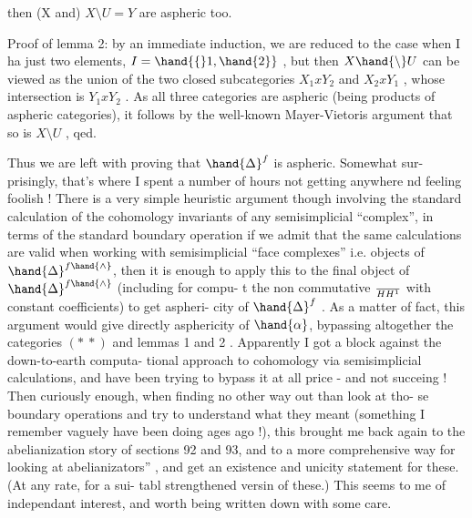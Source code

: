 
then (X and) $X\setminus U = Y$ are aspheric too.

Proof of lemma 2: by an immediate induction, we are reduced to
the case when I ha just two elements, $I = \hand{\{}1,\hand{2\}}$ , but then $X\hand{\setminus} U$
can be viewed as the union of the two closed subcategories $X_1 x Y_2$ and
$X_2 x Y_1$ , whose intersection is $Y_1 x Y_2$ . As all three categories are
aspheric (being products of aspheric categories), it follows by the
well-known Mayer-Vietoris argument that so is $X\setminus U$ , qed.

Thus we are left with proving that $\hand{\Delta}^{f}$ is aspheric. Somewhat sur-%
prisingly, that's where I spent a number of hours not getting anywhere
nd feeling foolish ! There is a very simple heuristic argument though
involving the standard calculation of the cohomology invariants of any
semisimplicial ``complex'', in terms of the standard boundary operation
 if we admit that the same calculations are valid when working with
semisimplicial ``face complexes'' i.e. objects of  $\hand{\Delta}^{f\hand{\wedge}}$, then it is
enough to apply this to the final object of $\hand{\Delta}^{f\hand{\wedge}}$ (including for compu-%
t  the non commutative $\over{H}{H}^1$ with constant coefficients) to get aspheri-%
city of $\hand{\Delta}^{f}$ . As a matter of fact, this argument would give directly
asphericity of $\hand{\alpha}$, bypassing altogether the categories $(*\ *)$ and lemmas
1 and 2 . Apparently I got a block against the down-to-earth computa-%
tional approach to cohomology via semisimplicial calculations, and
have been trying to bypass it at all price - and not succeing !
Then curiously enough, when finding no other way out than look at tho-%
se boundary operations and try to understand what they meant (something
I remember vaguely have been doing   ages ago !), this brought
me back again to the abelianization story of sections 92 and 93, and
to a more comprehensive way for looking at abelianizators'' , and get
an existence and unicity statement for these. (At any rate, for a sui-%
tabl strengthened versin of these.) This\xout{,} seems to me of independant
interest, and worth being written down with some care.

